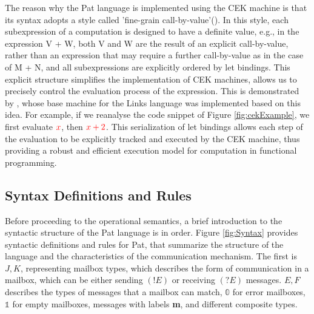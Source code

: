 \documentclass{l4proj}
\begin{document}
The reason why the Pat language is implemented using the CEK machine is that its syntax adopts a style called 'fine-grain call-by-value'(\cite{call-by-value}). In this style, each subexpression of a computation is designed to have a definite value, e.g., in the expression V + W, both V and W are the result of an explicit call-by-value, rather than an expression that may require a further call-by-value as in the case of M + N, and all subexpressions are explicitly ordered by let bindings. This explicit structure simplifies the implementation of CEK machines, allows us to precisely control the evaluation process of the expression. This is demonstrated by \cite{hillerstrm_2016_liberating}, whose base machine for the Links language was implemented based on this idea. For example, if we reanalyse the code snippet of Figure \ref{fig:cekExample}, we first evaluate $\color{red}{x}$, then $\color{red}{x + 2}$. This serialization of let bindings allows each step of the evaluation to be explicitly tracked and executed by the CEK machine, thus providing a robust and efficient execution model for computation in functional programming.

\subsection{Syntax Definitions and Rules}

Before proceeding to the operational semantics, a brief introduction to the syntactic structure of the Pat language is in order. Figure \ref{fig:Syntax} provides syntactic definitions and rules for Pat, that summarize the structure of the language and the characteristics of the communication mechanism. The first is $J, K$, representing mailbox types, which describes the form of communication in a mailbox, which can be either sending $(!E)$ or receiving $(?E)$ messages. $E, F$ describes the types of messages that a mailbox can match, $\mathbb{0}$ for error mailboxes, $\mathbb{1}$ for empty mailboxes, messages with labels \textcolor{red!80!black}{\textbf{m}}, and different composite types.
\end{document}

